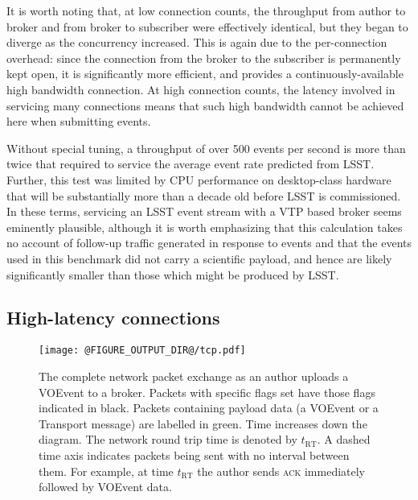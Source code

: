 \documentclass[5p,authoryear]{elsarticle}
\begin{document}
It is worth noting that, at low connection counts, the throughput from author
to broker and from broker to subscriber were effectively identical, but they
began to diverge as the concurrency increased. This is again due to the
per-connection overhead: since the connection from the broker to the
subscriber is permanently kept open, it is significantly more efficient, and
provides a continuously-available high bandwidth connection. At high
connection counts, the latency involved in servicing many connections means
that such high bandwidth cannot be achieved here when submitting events.

Without special tuning, a throughput of over 500 events per second is more
than twice that required to service the average event rate predicted from
LSST. Further, this test was limited by CPU performance on desktop-class
hardware that will be substantially more than a decade old before LSST is
commissioned. In these terms, servicing an LSST event stream with a VTP based
broker seems eminently plausible, although it is worth emphasizing that this
calculation takes no account of follow-up traffic generated in response to
events and that the events used in this benchmark did not carry a scientific
payload, and hence are likely significantly smaller than those which might be
produced by LSST.

\subsection{High-latency connections}
\label{sec:perf:highlatency}

\begin{figure}
  \begin{center}
  \texttt{[image: @FIGURE\_OUTPUT\_DIR@/tcp.pdf]}
  \end{center}

  \caption{The complete network packet exchange as an author uploads a VOEvent
  to a broker. Packets with specific flags set have those flags indicated in
  black.  Packets containing payload data (a VOEvent or a Transport message)
  are labelled in green.  Time increases down the diagram. The network round
  trip time is denoted by $t_\mathrm{RT}$. A dashed time axis indicates
  packets being sent with no interval between them. For example, at time
  $t_\mathrm{RT}$ the author sends \textsc{ack} immediately followed by
  VOEvent data.}

  \label{fig:tcp}
\end{figure}
\end{document}
